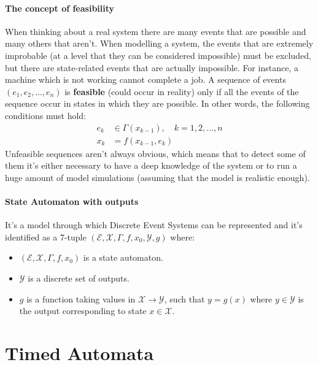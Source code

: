 \documentclass[12pt,a4paper]{article}
\begin{document}
\paragraph{The concept of feasibility} When thinking about a real system there are many events that are possible and many others that aren’t. When modelling a system, the events that are extremely improbable (at a level that they can be considered impossible) must be excluded, but there are state-related events that are actually impossible. For instance, a machine which is not working cannot complete a job. A sequence of events $(e_1,e_2,\dots,e_n)$ is \textbf{feasible} (could occur in reality) only if all the events of the sequence occur in states in which they are possible. In other words, the following conditions must hold:
\begin{align*}
e_k &\in \Gamma (x_{k-1}), \quad k = 1,2,\dots,n \\ 
x_k &= f(x_{k-1},e_k)
\end{align*}
Unfeasible sequences aren’t always obvious, which means that to detect some of them it’s either necessary to have a deep knowledge of the system or to run a huge amount of model simulations (assuming that the model is realistic enough).

\paragraph{State Automaton with outputs} It’s a model through which Discrete Event Systems can be represented and it’s identified as a 7-tuple $(\mathcal{E},\mathcal{X},\Gamma,f,x_0,\mathcal{Y},g)$ where:
\begin{itemize}
\item $(\mathcal{E},\mathcal{X},\Gamma,f,x_0)$ is a state automaton.
\item $\mathcal{Y}$ is a discrete set of outputs.
\item $g$ is a function taking values in $\mathcal{X}\rightarrow\mathcal{Y}$, such that $y=g(x)$ where $y\in\mathcal{Y}$ is the output corresponding to state $x\in\mathcal{X}$.
\end{itemize}
\newpage
\section{Timed Automata}
\label{sec:TA}
\end{document}
